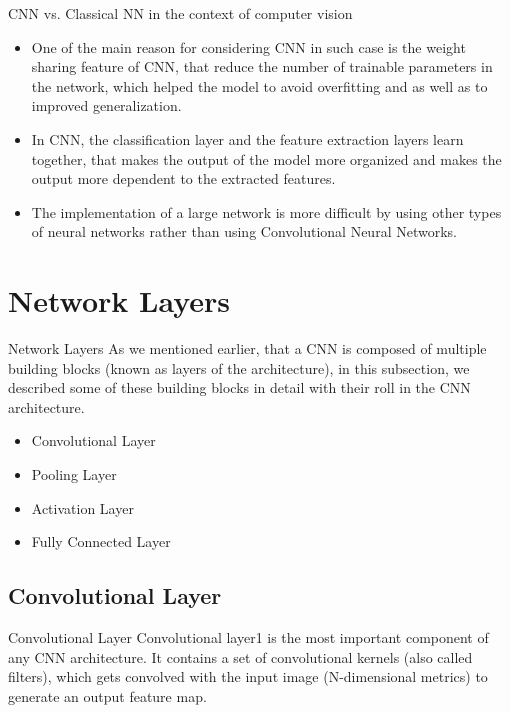 \documentclass[aspectratio=169,xcolor=dvipsnames]{beamer}
\begin{document}
\begin{frame}{CNN vs. Classical NN in the context of computer vision}
    \begin{itemize}
        \item One of the main reason for considering CNN in such case is the weight sharing feature of CNN, that reduce the number of trainable parameters in the network, which helped the model to avoid overﬁtting and as well as to improved generalization.
        \item In CNN, the classiﬁcation layer and the feature extraction layers learn together, that makes the output of the model more organized and makes the output more dependent to the extracted features.
        \item The implementation of a large network is more diﬃcult by using other types of neural networks rather than using Convolutional Neural Networks.
    \end{itemize}
\end{frame}

\section{Network Layers}
\begin{frame}{Network Layers}
    As we mentioned earlier, that a CNN is composed of multiple building blocks (known as layers of the architecture), in this subsection, we described some of these building blocks in detail with their roll in the CNN architecture.

\begin{itemize}
    \item Convolutional Layer
    \item Pooling Layer
    \item Activation Layer
    \item Fully Connected Layer
\end{itemize}
\end{frame}
\subsection{Convolutional Layer}
\begin{frame}{Convolutional Layer}
    Convolutional layer1 is the most important component of any CNN architecture. It contains a set of convolutional kernels (also called ﬁlters), which gets convolved with the input image (N-dimensional metrics) to generate an output feature map.
\end{frame}
\end{document}
